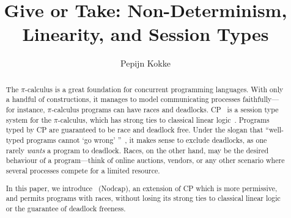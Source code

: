 \documentclass[a4paper,UKenglish]{lipics-v2016}
\title{Give or Take: Non-Determinism, Linearity, and Session Types}%
\author[1]{Pepijn Kokke}%
\affil[1]{LFCS, University of Edinburgh, Edinburgh, United Kingdom\\
  \texttt{pepijn.kokke@ed.ac.uk}}%
\begin{document}
\maketitle

\begin{abstract}
  The $\pi$-calculus is a great foundation for concurrent programming languages.
  With only a handful of constructions, it manages to model communicating
  processes faithfully---for instance, $\pi$-calculus programs can have races
  and deadlocks. 
  CP~\cite{wadler2012} is a session type system for the $\pi$-calculus, which
  has strong ties to classical linear logic~\cite{girard1987}. Programs typed by
  CP are guaranteed to be race and deadlock free. 
  Under the slogan that ``well-typed programs cannot `go wrong'\!\!
  ''~\cite{milner1978}, it makes sense to exclude deadlocks, as one rarely
  \emph{wants} a program to deadlock. 
  Races, on the other hand, may be the desired behaviour of a program---think
  of online auctions, vendors, or any other scenario where several processes
  compete for a limited resource. 

  In this paper, we introduce \nodcap\ (Nodcap), an extension of CP which is more
  permissive, and permits programs with races, without losing its strong ties
  to classical linear logic or the guarantee of deadlock freeness. 
\end{abstract}
\end{document}
